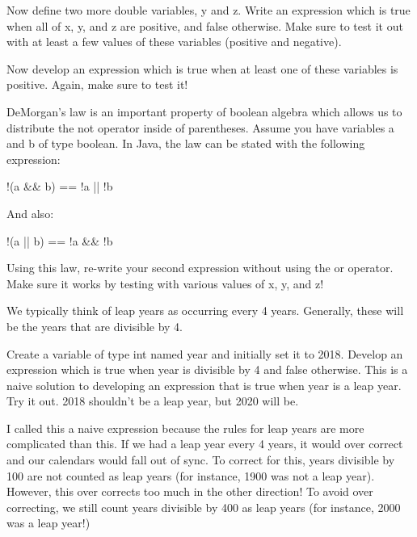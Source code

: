 \begin{exer}
Now define two more double variables, y and z. Write an expression which is true when all of x, y, and z are positive, and false otherwise. Make sure to test it out with at least a few values of these variables (positive and negative).

\evalline

Now develop an expression which is true when at least one of these variables is positive. Again, make sure to test it!

\evalline
\end{exer}

DeMorgan's law is an important property of boolean algebra which allows us to distribute the not operator inside of parentheses. Assume you have variables a and b of type boolean. In Java, the law can be stated with the following expression:

\begin{code}
!(a && b) == !a || !b
\end{code}

And also:

\begin{code}
!(a || b) == !a && !b
\end{code}

\begin{exer}
Using this law, re-write your second expression without using the or operator. Make sure it works by testing with various values of x, y, and z!

\evalline
\end{exer}


We typically think of leap years as occurring every 4 years. Generally, these will be the years that are divisible by 4. 


\begin{exer}
Create a variable of type int named year and initially set it to 2018. Develop an expression which is true when year is divisible by 4 and false otherwise. This is a naive solution to developing an expression that is true when year is a leap year. Try it out. 2018 shouldn't be a leap year, but 2020 will be.

\evalline

\end{exer}

I called this a naive expression because the rules for leap years are more complicated than this. If we had a leap year every 4 years, it would over correct and our calendars would fall out of sync. To correct for this, years divisible by 100 are not counted as leap years (for instance, 1900 was not a leap year). However, this over corrects too much in the other direction! To avoid over correcting, we still count years divisible by 400 as leap years (for instance, 2000 was a leap year!)

